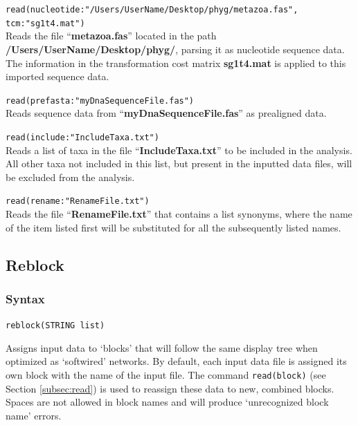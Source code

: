 	\begin{example}
		\item{\texttt{read(nucleotide:"/Users/UserName/Desktop/phyg/metazoa.fas", 
		tcm:"sg1t4.mat")}\\ Reads the file ``\textbf{metazoa.fas}'' located in the path 
		\textbf{/Users/UserName/Desktop/phyg/}, parsing it as nucleotide sequence 
		data. The information in the transformation cost matrix \textbf{sg1t4.mat} 
		is applied to this imported sequence data.}
		
		\item{\texttt{read(prefasta:"myDnaSequenceFile.fas")}\\ Reads sequence data from 
		``\textbf{myDnaSequenceFile.fas}'' as prealigned data.}
		
		\item{\texttt{read(include:"IncludeTaxa.txt")}\\ Reads a list of taxa in the file 
		``\textbf{IncludeTaxa.txt}'' to be included in the analysis. All other taxa not included 
		in this list, but present in the inputted data files, will be excluded from the analysis.}
		
		\item{\texttt{read(rename:"RenameFile.txt")}\\ Reads the file ``\textbf{RenameFile.txt}'' 
		that contains a list synonyms, where the name of the item listed first will be substituted 
		for all the subsequently listed names. }
	\end{example}
		
\subsection{Reblock}
\label{subsec:reblock}
	\subsubsection{Syntax}
		\texttt{reblock(STRING list)}
	
	\begin{phygdescription}
		{Assigns input data to `blocks' that will follow the same display tree when optimized
		as `softwired' networks. By default, each input data file is assigned its own block with 
		the name of the input file. The command \texttt{read(block)} (see Section \ref{subsec:read}) 
		is used to reassign these data to new, combined blocks. Spaces are not allowed in 
		block names and will produce `unrecognized block name' errors.} 
	\end{phygdescription}
	
